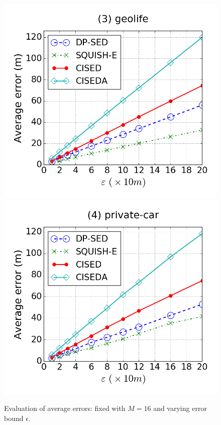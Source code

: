 \begin{figure}[tb]
\includegraphics[scale = 0.250]{figures/Exp-error-epsilon-geolife.png}
\includegraphics[scale = 0.250]{figures/Exp-error-epsilon-private.png}
\vspace{-2ex}
\caption{\small Evaluation of average errors: fixed with $M=16$ and varying error bound $\epsilon$.}
\label{fig:ae-m20}
\vspace{-2ex}
\end{figure}






